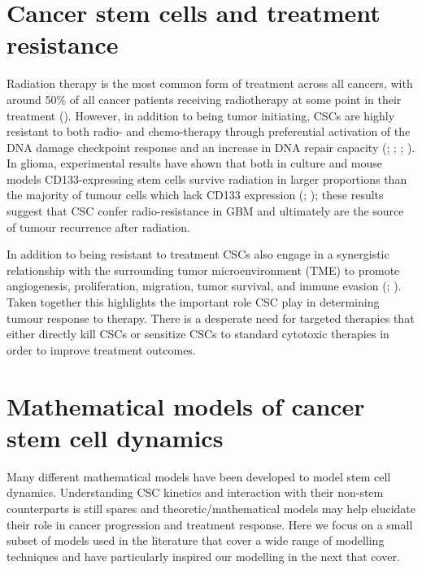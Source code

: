 \documentclass[
  letterpaper,
]{scrreprt}
\theoremstyle{definition}
\theoremstyle{remark}
\begin{document}
\section{Cancer stem cells and treatment
resistance}\label{sec-cancer-stem-cells-and-treatment-resistance}

Radiation therapy is the most common form of treatment across all
cancers, with around 50\% of all cancer patients receiving radiotherapy
at some point in their treatment (). However, in addition to being tumor initiating, CSCs are
highly resistant to both radio- and chemo-therapy through preferential
activation of the DNA damage checkpoint response and an increase in DNA
repair capacity (;
; ; ). In glioma,
experimental results have shown that both in culture and mouse models
CD133-expressing stem cells survive radiation in larger proportions than
the majority of tumour cells which lack CD133 expression
(; ); these results suggest that CSC confer radio-resistance in
GBM and ultimately are the source of tumour recurrence after radiation.

In addition to being resistant to treatment CSCs also engage in a
synergistic relationship with the surrounding tumor microenvironment
(TME) to promote angiogenesis, proliferation, migration, tumor survival,
and immune evasion (;
). Taken together this highlights the
important role CSC play in determining tumour response to therapy. There
is a desperate need for targeted therapies that either directly kill
CSCs or sensitize CSCs to standard cytotoxic therapies in order to
improve treatment outcomes.

\section{Mathematical models of cancer stem cell
dynamics}\label{sec-mathematical-models-of-cancer-stem-cell-dynamics}

Many different mathematical models have been developed to model stem
cell dynamics. Understanding CSC kinetics and interaction with their
non-stem counterparts is still spares and theoretic/mathematical models
may help elucidate their role in cancer progression and treatment
response. Here we focus on a small subset of models used in the
literature that cover a wide range of modelling techniques and have
particularly inspired our modelling in the next that cover.
\end{document}
